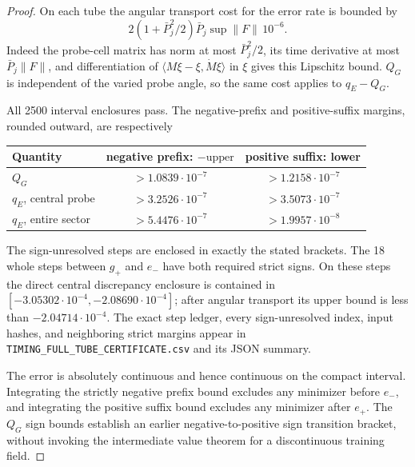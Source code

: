 \documentclass[10pt]{article}
\begin{document}
\begin{proof}
On each tube the angular transport cost for the error rate is bounded by
\[
 2(1+\bar P_j^2/2)\bar P_j\sup\|F\|\,10^{-6}.
\]
Indeed the probe-cell matrix has norm at most $\bar P_j^2/2$, its time
derivative at most $\bar P_j\|F\|$, and differentiation of
$\langle M\xi-\xi,\dot M\xi\rangle$ in $\xi$ gives this Lipschitz bound.
$Q_G$ is independent of the varied probe angle, so the same cost applies
to $q_E-Q_G$.

All 2500 interval enclosures pass. The negative-prefix and positive-suffix
margins, rounded outward, are respectively
\begin{center}
\begin{tabular}{lcc}
\toprule
Quantity & negative prefix: $-\text{upper}$ & positive suffix: lower\\
\midrule
$Q_G$ & $>1.0839\cdot10^{-7}$ & $>1.2158\cdot10^{-7}$\\
$q_E$, central probe & $>3.2526\cdot10^{-7}$ & $>3.5073\cdot10^{-7}$\\
$q_E$, entire sector & $>5.4476\cdot10^{-7}$ & $>1.9957\cdot10^{-8}$\\
\bottomrule
\end{tabular}
\end{center}
The sign-unresolved steps are enclosed in exactly the stated brackets.
The 18 whole steps between $g_+$ and $e_-$ have both required strict signs.
On these steps the direct central discrepancy enclosure is contained in
$[-3.05302\cdot10^{-4},-2.08690\cdot10^{-4}]$; after angular transport its
upper bound is less than $-2.04714\cdot10^{-4}$.
The exact step ledger, every sign-unresolved index, input hashes, and
neighboring strict margins appear in
\texttt{TIMING\_FULL\_TUBE\_CERTIFICATE.csv} and its JSON summary.

The error is absolutely continuous and hence continuous on the compact
interval. Integrating the strictly negative prefix bound excludes any
minimizer before $e_-$, and integrating the positive suffix bound excludes
any minimizer after $e_+$. The $Q_G$ sign bounds establish an earlier
negative-to-positive sign transition bracket, without invoking the
intermediate value theorem for a discontinuous training field.
\end{proof}
\end{document}
